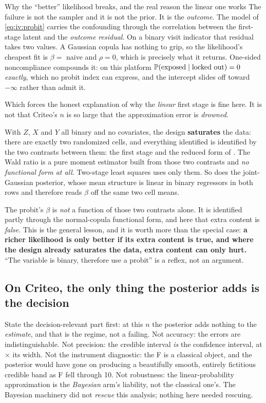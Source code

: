 \begin{intuition}{Why the ``better'' likelihood breaks, and the real reason the linear one works}
The failure is not the sampler and it is not the prior. It is the \emph{outcome}. The model of
\cref{eq:iv:probit} carries the confounding through the correlation between the first-stage latent
and the \emph{outcome residual}. On a binary visit indicator that residual takes two values.
A Gaussian copula has nothing to grip, so the likelihood's cheapest fit is $\beta = $ naive and
$\rho = 0$, which is precisely what it returns. One-sided noncompliance compounds it: on this
platform $\operatorname{\mathbb{P}}(\text{exposed} \mid \text{locked out}) = 0$ \emph{exactly}, which no probit index can
express, and the intercept slides off toward $-\infty$ rather than admit it.

Which forces the honest explanation of why the \emph{linear} first stage is fine here. It is not
that Criteo's $n$ is so large that the approximation error is \emph{drowned}.

With $Z$, $X$ and $Y$ all binary and no covariates, the design \textbf{saturates} the data: there
are exactly two randomized cells, and everything identified is identified by the two contrasts
between them: the first stage and the reduced form of
. The Wald ratio is a pure moment estimator built
from those two contrasts and \emph{no functional form at all}. Two-stage least squares uses only
them. So does the joint-Gaussian posterior, whose mean structure is linear in binary regressors in
both rows and therefore reads $\beta$ off the same two cell means.

The probit's $\beta$ is \emph{not} a function of those two contrasts alone. It is identified partly
through the normal-copula functional form, and here that extra content is \emph{false}. This is
the general lesson, and it is worth more than the special case:
\textbf{a richer likelihood is only better if its extra content is true, and where the design
already saturates the data, extra content can only hurt.} ``The variable is binary, therefore use a
probit'' is a reflex, not an argument.
\end{intuition}

\subsection*{On Criteo, the only thing the posterior adds is the decision}

State the decision-relevant part first: at this $n$ the posterior adds nothing to the \emph{estimate},
and that is the regime, not a failing. Not accuracy: the errors are indistinguishable. Not precision:
the credible interval \emph{is} the confidence interval, at \nbElevenBWidthRatio$\times$ its width.
Not the instrument diagnostic: the F is a classical object, and the posterior would have gone on
producing a beautifully smooth, entirely fictitious credible band as F fell through 10. Not
robustness: the linear-probability approximation is the \emph{Bayesian} arm's liability, not the
classical one's. The Bayesian machinery did not \emph{rescue} this analysis; nothing here needed
rescuing.


